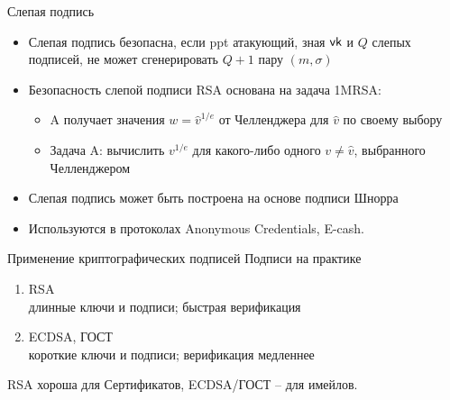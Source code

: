 \documentclass[usenames,dvipsnames,8pt,aspectratio=169]{beamer}
\begin{document}
\begin{frame}{Слепая подпись }

\Large

\begin{itemize}
\itemsep10pt
\item Слепая подпись безопасна, если ppt атакующий, зная $\textsf{vk}$ и $Q$ слепых подписей, не может сгенерировать $Q+1$ пару  $(m, \sigma)$
\item Безопасность слепой подписи RSA основана на задача 1MRSA: \\
\begin{itemize}
	\itemsep5pt
	\large 
	\item {\color{Orange} A} получает значения $w = \hat{v}^{1/e}$ от Челленджера для $\hat{v}$ по своему выбору
	\item Задача {\color{Orange} A}: вычислить $v^{1/e}$ для какого-либо одного $v \neq \hat{v}$, выбранного Челленджером
\end{itemize}	

\item Слепая подпись может быть построена на основе подписи Шнорра
\item Используются в протоколах Anonymous Credentials, E-cash. 
\end{itemize}


\end{frame}

\begin{frame}{Применение криптографических подписей}
\Large
Подписи на практике
\begin{enumerate}
\itemsep 10pt
\item RSA \\
длинные ключи и подписи; быстрая верификация
\item ECDSA, ГОСТ\\
короткие ключи и подписи; верификация медленнее
\end{enumerate}
\vspace{10pt}
RSA хороша для {\color{Orange} Сертификатов}, ECDSA/ГОСТ -- для имейлов. \\[10pt]


\end{frame}
\end{document}
